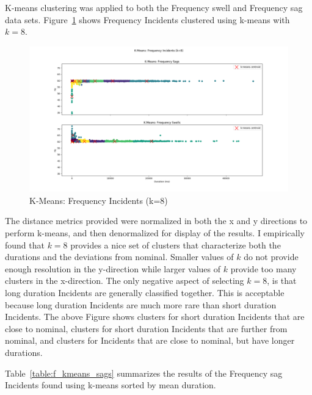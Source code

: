 K-means clustering was applied to both the Frequency swell and Frequency sag data sets. Figure~\ref{fig:f_kmeans} shows Frequency Incidents clustered using k-means with $k=8$.

\begin{figure}[H]
    \centering
    \includegraphics[width=\linewidth]{figures/f_kmeans.png}
    \caption{K-Means: Frequency Incidents (k=8)}
    \label{fig:f_kmeans}
\end{figure}

The distance metrics provided were normalized in both the x and y directions to perform k-means, and then denormalized for display of the results. I empirically found that $k=8$ provides a nice set of clusters that characterize both the durations and the deviations from nominal. Smaller values of $k$ do not provide enough resolution in the y-direction while larger values of $k$ provide too many clusters in the x-direction. The only negative aspect of selecting $k=8$, is that long duration Incidents are generally classified together. This is acceptable because long duration Incidents are much more rare than short duration Incidents. The above Figure shows clusters for short duration Incidents that are close to nominal, clusters for short duration Incidents that are further from nominal, and clusters for Incidents that are close to nominal, but have longer durations.

Table~\ref{table:f_kmeans_sags} summarizes the results of the Frequency sag Incidents found using k-means sorted by mean duration.

